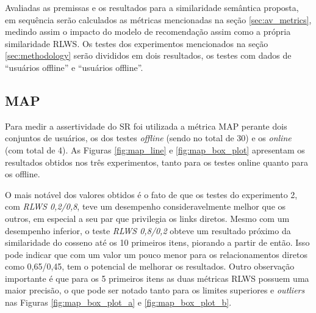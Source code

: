 Avaliadas as premissas e os resultados para a similaridade semântica proposta, em sequência serão calculados as métricas mencionadas na seção \ref{sec:av_metrics}, medindo assim o impacto do modelo de recomendação assim como a própria similaridade \ac{RLWS}. Os testes dos experimentos mencionados na seção \ref{sec:methodology} serão divididos em dois resultados, os testes com dados de \enquote{usuários offline} e \enquote{usuários offline}.

\subsection{MAP}

Para medir a assertividade do \ac{SR} foi utilizada a métrica \ac{MAP} perante dois conjuntos de usuários, os dos testes \textit{offline} (sendo no total de 30) e os \textit{online} (com total de 4). As Figuras \ref{fig:map_line} e \ref{fig:map_box_plot} apresentam os resultados obtidos nos três experimentos, tanto para os testes online quanto para os offline. 

O mais notável dos valores obtidos é o fato de que os testes do experimento 2, com \textit{RLWS 0,2/0,8}, teve um desempenho consideravelmente melhor que os outros, em especial a seu par que privilegia os links diretos. Mesmo com um desempenho inferior, o teste \textit{RLWS 0,8/0,2} obteve um resultado próximo da similaridade do cosseno até os 10 primeiros itens, piorando a partir de então. Isso pode indicar que com um valor um pouco menor para os relacionamentos diretos como 0,65/0,45, tem o potencial de melhorar os resultados. Outro observação importante é que para os 5 primeiros itens as duas métricas \ac{RLWS} possuem uma maior precisão, o que pode ser notado tanto para os limites superiores e \textit{outliers} nas Figuras \ref{fig:map_box_plot_a} e \ref{fig:map_box_plot_b}.


